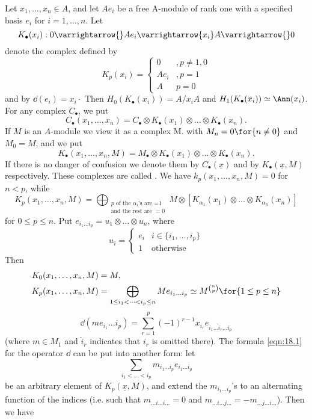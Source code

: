 \documentclass[../main]{subfiles}
\begin{document}
Let $x_{1}, \dots, x_{n} \in A$, and let $A e_{i}$ be a free A-module of rank one with a specified basis $e_{i}$ for $i=1, \dots, n$. Let 
\[K_{\bullet}(x_{i}): 0 \varrightarrow{} A e_{i} \varrightarrow{x_i} A \varrightarrow{} 0\]
denote the complex defined by
\[K_p(x_i) = \begin{cases} 0 &, p\neq 1,0 \\ Ae_i &, p=1\\ A & p=0\end{cases}\]
and by $\dd(e_{i})=x_{i} \cdot$ Then $H_{0}(K_{\bullet}(x_{i}))=A / x_{i} A$ and $H_{1}(K_{\bullet}(x_{i})) \simeq \Ann(x_{i})$. For any complex $C_\bullet$, we put \[C_\bullet(x_{1}, \dots, x_{n})=C_\bullet \otimes K_\bullet(x_{1}) \otimes \dots \otimes K_\bullet(x_{n}).\] 
If $M$ is an $A$-module we view it as a complex M. with $M_{n}=0\for{n \neq 0}$ and $M_{0}=M$, and we put \[K_{\bullet}(x_{1}, \dots, x_{n}, M)=M_\bullet \otimes K_\bullet(x_{1}) \otimes \dots \otimes K_\bullet(x_{n}).\] If there is no danger of confusion we denote them by $C_\bullet(\underline{x})$ and by $K_\bullet (\underline{x}, M)$ respectively. These complexes are called . We have \linebreak$k_{p}(x_{1}, \dots, x_{n}, M)=0$ for $n<p$, while
\[
K_{p}(x_{1}, \dots, x_{n}, M)= \bigoplus_{\substack{p \text{ of the } \alpha_i\text{'s are =1}\\ \text{and the rest are }=0}} M\otimes [K_{\alpha_1}(x_1)\otimes \dots \otimes K_{\alpha_n} (x_n)]
\]
for $0 \leqslant p \leqslant n$. Put $e_{i_{1} \dots i_{p}}=u_{1} \otimes \dots \otimes u_{n}$, where \[u_i =\begin{cases}e_i & i\in \{i_1,\dots , i_p\}\\ 1&\text{otherwise}\end{cases}\] Then
\[\begin{aligned}
K_{0}(x_{1}, \dots, x_{n}, M)&=M,\\
K_p(x_1,\dots,x_n,M) &= \bigoplus_{1\leq i_1<\dots<i_p\leq n} Me_{i_1\dots i_p} \simeq M^{\binom{n}{p}} \for{1\leq p\leq n}
\end{aligned}\]
\[\tag{18.1}\label{eqn:18.1}\dd(m e_{i_{1}} \dots i_{p})=\sum_{r=1}^{p}(-1)^{r-1} x_{i_{r}} e_{i_{1} \dots \hat{i}_{r} \dots i_{p}}\]
(where $m \in M_{1}$ and $\hat{i}_{r}$ indicates that $i_{r}$ is omitted there).
The formula \ref{eqn:18.1} for the operator $\dd$ can be put into another
form: let \[\sum_{ i_{1}<\dots<i_{p} }m_{i_1 \dots i_{p}} e_{i_{1} \dots i_{p}}\] be an arbitrary
element of $K_{p}(\underline{x}, M)$, and extend the $m_{i_{1} \dots i_{p}}$'s to an alternating function of the indices (i.e. such that $m_{\dots i \dots i\dots }=0$
and $m_{\dots i \dots j \dots}=-m_{\dots j \dots i \dots}$). Then we have
\end{document}

